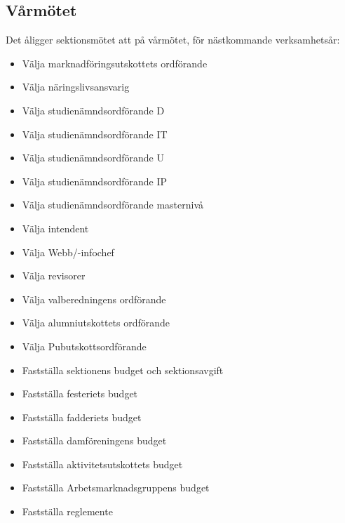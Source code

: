 \documentclass{datateknologsektionen-document}
\begin{document}
    \subsection{Vårmötet}
      Det åligger sektionsmötet att på vårmötet, för nästkommande verksamhetsår:
      \begin{itemize}
        \item Välja marknadföringsutskottets ordförande
        \item Välja näringslivsansvarig
        \item Välja studienämndsordförande D
        \item Välja studienämndsordförande IT
        \item Välja studienämndsordförande U
        \item Välja studienämndsordförande IP
        \item Välja studienämndsordförande masternivå
        \item Välja intendent
        \item Välja Webb/-infochef
        \item Välja revisorer
        \item Välja valberedningens ordförande
        \item Välja alumniutskottets ordförande
        \item Välja Pubutskottsordförande
        \item Fastställa sektionens budget och sektionsavgift
        \item Fastställa festeriets budget
        \item Fastställa fadderiets budget
        \item Fastställa damföreningens budget
        \item Fastställa aktivitetsutskottets budget
        \item Fastställa Arbetsmarknadsgruppens budget
        \item Fastställa reglemente
      \end{itemize}
\end{document}

